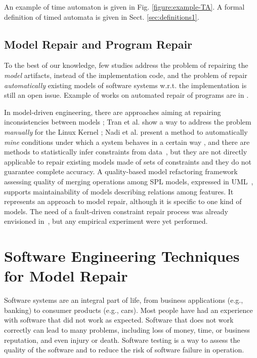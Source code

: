 An example of time automaton is given in Fig. \ref{figure:example-TA}.%
A formal definition of timed automata is given in Sect. \ref{sec:definitions1}.

\subsection{Model Repair and Program Repair}
To the best of our knowledge, few studies address the problem of repairing the \textit{model} artifacts, instead of the implementation code, and the problem of repair \textit{automatically} existing models of software systems w.r.t. the implementation is still an open issue. 
Example of works on automated repair of programs are in \cite{Nguyen_2013,le_goues_systematic_2012,ARCURI20113494}.

In model-driven engineering, there are approaches aiming at repairing inconsistencies between models \cite{Macedo_2013}; Tran et al. show a way to address the problem \textit{manually} for the Linux Kernel \cite{Tran:1999:FRR:781995.782007}; Nadi et al. present a method to automatically \textit{mine} conditions under which a system behaves in a certain way \cite{NadiBKC14}, and there are methods to statistically infer constraints from data~\cite{chiang_unified_2011,Abukwaik_2016}, but they are not directly applicable to repair existing models made of sets of constraints and they do not guarantee complete accuracy. 
A quality-based model refactoring framework assessing quality of merging operations among SPL models, expressed in UML~\cite{rubin_quality_2013}, supports maintainability of models describing relations among features. It represents an approach to model repair, although it is specific to one kind of models.
The need of a fault-driven constraint repair process was already envisioned in~\cite{henard_towards_2013}, but any empirical experiment were yet performed.

\section{Software Engineering Techniques for Model Repair}\label{sec:testing}
Software systems are an integral part of life, from business applications (e.g., banking) to consumer
products (e.g., cars). Most people have had an experience with software that did not work as expected.
Software that does not work correctly can lead to many problems, including loss of money, time, or
business reputation, and even injury or death. Software testing is a way to assess the quality of the
software and to reduce the risk of software failure in operation.

